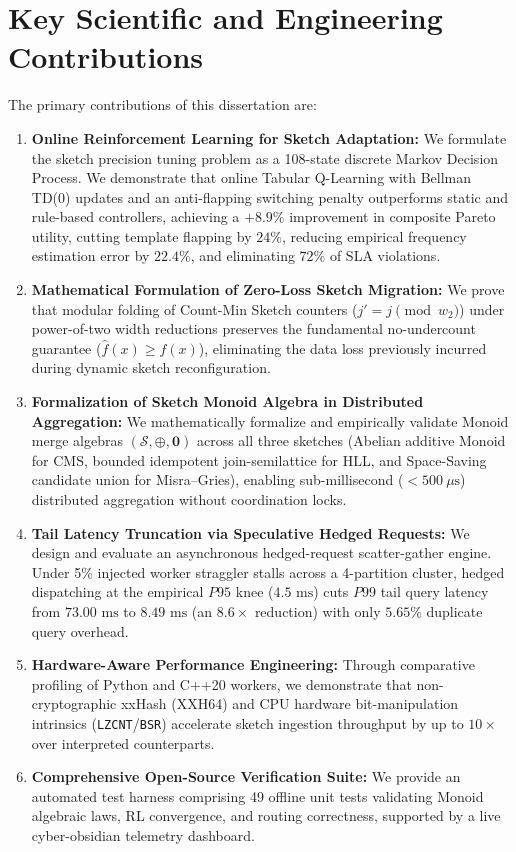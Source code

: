 \section{Key Scientific and Engineering Contributions}

The primary contributions of this dissertation are:

\begin{enumerate}
 \item \textbf{Online Reinforcement Learning for Sketch Adaptation:} We formulate the sketch precision tuning problem as a 108-state discrete Markov Decision Process. We demonstrate that online Tabular Q-Learning with Bellman TD(0) updates and an anti-flapping switching penalty outperforms static and rule-based controllers, achieving a $+8.9\%$ improvement in composite Pareto utility, cutting template flapping by $24\%$, reducing empirical frequency estimation error by $22.4\%$, and eliminating $72\%$ of SLA violations.
 
 \item \textbf{Mathematical Formulation of Zero-Loss Sketch Migration:} We prove that modular folding of Count-Min Sketch counters ($j' = j \pmod{w_2}$) under power-of-two width reductions preserves the fundamental no-undercount guarantee ($\hat{f}(x) \ge f(x)$), eliminating the data loss previously incurred during dynamic sketch reconfiguration.

 \item \textbf{Formalization of Sketch Monoid Algebra in Distributed Aggregation:} We mathematically formalize and empirically validate Monoid merge algebras $(\mathcal{S}, \oplus, \mathbf{0})$ across all three sketches (Abelian additive Monoid for CMS, bounded idempotent join-semilattice for HLL, and Space-Saving candidate union for Misra--Gries), enabling sub-millisecond ($<500\ \mu\text{s}$) distributed aggregation without coordination locks.

 \item \textbf{Tail Latency Truncation via Speculative Hedged Requests:} We design and evaluate an asynchronous hedged-request scatter-gather engine. Under 5\% injected worker straggler stalls across a 4-partition cluster, hedged dispatching at the empirical $P95$ knee ($4.5\text{ ms}$) cuts $P99$ tail query latency from $73.00\text{ ms}$ to $8.49\text{ ms}$ (an $8.6\times$ reduction) with only $5.65\%$ duplicate query overhead.

 \item \textbf{Hardware-Aware Performance Engineering:} Through comparative profiling of Python and C++20 workers, we demonstrate that non-cryptographic xxHash (XXH64) and CPU hardware bit-manipulation intrinsics (\texttt{LZCNT}/\texttt{BSR}) accelerate sketch ingestion throughput by up to $10\times$ over interpreted counterparts.

 \item \textbf{Comprehensive Open-Source Verification Suite:} We provide an automated test harness comprising 49 offline unit tests validating Monoid algebraic laws, RL convergence, and routing correctness, supported by a live cyber-obsidian telemetry dashboard.
\end{enumerate}

